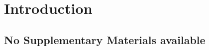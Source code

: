 \chapter{Introduction}
\label{chapter:introduction}

\graphicspath{{Chapter1/Figs/}{Chapter1/Figs/PDF/}{Chapter1/Figs/}}%

\section{No Supplementary Materials available}